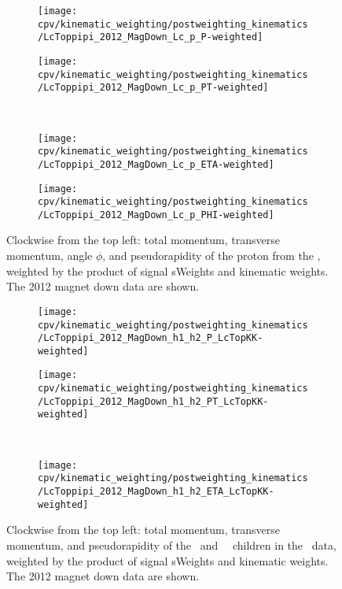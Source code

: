 \begin{figure}
  \begin{subfigure}[b]{0.4\textwidth}
    \texttt{[image: cpv/kinematic\_weighting/postweighting\_kinematics/LcToppipi\_2012\_MagDown\_Lc\_p\_P-weighted]}
    \label{fig:cpv:kinematic_weighting:post:Lc_p:P}
  \end{subfigure}
  \begin{subfigure}[b]{0.4\textwidth}
    \texttt{[image: cpv/kinematic\_weighting/postweighting\_kinematics/LcToppipi\_2012\_MagDown\_Lc\_p\_PT-weighted]}
    \label{fig:cpv:kinematic_weighting:post:Lc_p:PT}
  \end{subfigure}\\
  \begin{subfigure}[b]{0.4\textwidth}
    \texttt{[image: cpv/kinematic\_weighting/postweighting\_kinematics/LcToppipi\_2012\_MagDown\_Lc\_p\_ETA-weighted]}
    \label{fig:cpv:kinematic_weighting:post:Lc_p:ETA}
  \end{subfigure}
  \begin{subfigure}[b]{0.4\textwidth}
    \texttt{[image: cpv/kinematic\_weighting/postweighting\_kinematics/LcToppipi\_2012\_MagDown\_Lc\_p\_PHI-weighted]}
    \label{fig:cpv:kinematic_weighting:post:Lc_p:PHI}
  \end{subfigure}
  \caption{%
    Clockwise from the top left: total momentum, transverse momentum, angle 
    $\phi$, and pseudorapidity of the proton from the \PLambdac, weighted by 
    the product of signal sWeights and kinematic weights.
    The 2012 magnet down data are shown.
  }
  \label{fig:cpv:kinematic_weighting:post:Lc_p}
\end{figure}

\begin{figure}
  \begin{subfigure}[b]{0.5\textwidth}
    \centering
    \texttt{[image: cpv/kinematic\_weighting/postweighting\_kinematics/LcToppipi\_2012\_MagDown\_h1\_h2\_P\_LcTopKK-weighted]}
    \label{fig:cpv:kinematic_weighting:post:pKK_h1h2:P}
  \end{subfigure}
  \begin{subfigure}[b]{0.5\textwidth}
    \centering
    \texttt{[image: cpv/kinematic\_weighting/postweighting\_kinematics/LcToppipi\_2012\_MagDown\_h1\_h2\_PT\_LcTopKK-weighted]}
    \label{fig:cpv:kinematic_weighting:post:pKK_h1h2:PT}
  \end{subfigure}\\
  \begin{subfigure}[b]{\textwidth}
    \centering
    \texttt{[image: cpv/kinematic\_weighting/postweighting\_kinematics/LcToppipi\_2012\_MagDown\_h1\_h2\_ETA\_LcTopKK-weighted]}
    \label{fig:cpv:kinematic_weighting:post:pKK_h1h2:ETA}
  \end{subfigure}
  \caption{%
    Clockwise from the top left: total momentum, transverse momentum, and 
    pseudorapidity of the \PKminus\ and \PKplus\ \PLambdac\ children in the 
    \pKK\ data, weighted by the product of signal sWeights and kinematic 
    weights.
    The 2012 magnet down data are shown.
  }
  \label{fig:cpv:kinematic_weighting:post:pKK_h1h2}
\end{figure}

